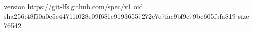 version https://git-lfs.github.com/spec/v1
oid sha256:48f60a0e5e44711f028e09f681e91936557272e7e7fac9bf9c79bc605fbfa819
size 76542
